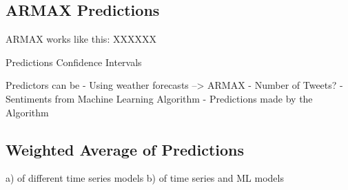 \subsection{ARMAX Predictions}
ARMAX works like this: 
XXXXXX

Predictions
Confidence Intervals


Predictors can be 
- Using weather forecasts --> ARMAX
- Number of Tweets?
- Sentiments from Machine Learning Algorithm
- Predictions made by the Algorithm



\subsection{Weighted Average of Predictions}
a) of different time series models
b) of time series and ML models
